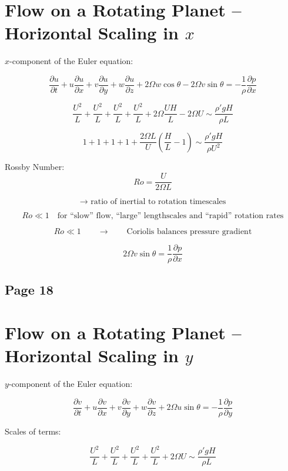 \documentclass[11pt]{article}
\begin{document}
\section*{Flow on a Rotating Planet -- Horizontal Scaling in $x$}

$x$-component of the Euler equation:

\[
    \frac{\partial u}{\partial t}
    +u\frac{\partial u}{\partial x}
    +v\frac{\partial u}{\partial y}
    +w\frac{\partial u}{\partial z}
    +2\Omega w\cos\theta
    -2\Omega v\sin\theta
    =
    -\frac{1}{\rho}\frac{\partial p}{\partial x}
\]

\[
    \frac{U^2}{L}
    +\frac{U^2}{L}
    +\frac{U^2}{L}
    +\frac{U^2}{L}
    +2\Omega\frac{UH}{L}
    -2\Omega U
    \sim
    \frac{\rho' g H}{\rho L}
\]

\[
    1+1+1+1
    +
    \frac{2\Omega L}{U}\left(\frac{H}{L}-1\right)
    \sim
    \frac{\rho' g H}{\rho U^2}
\]

Rossby Number:
\[
    Ro=\frac{U}{2\Omega L}
\]

\[
    \to \text{ ratio of inertial to rotation timescales}
\]

\[
    Ro \ll 1
    \quad
    \text{for ``slow'' flow, ``large'' lengthscales and ``rapid'' rotation rates}
\]

\[
    Ro \ll 1
    \qquad\to\qquad
    \text{Coriolis balances pressure gradient}
\]

\[
    2\Omega v\sin\theta
    =
    \frac{1}{\rho}\frac{\partial p}{\partial x}
\]

\subsection*{Page 18}
\section*{Flow on a Rotating Planet -- Horizontal Scaling in $y$}

$y$-component of the Euler equation:

\[
    \frac{\partial v}{\partial t}
    +u\frac{\partial v}{\partial x}
    +v\frac{\partial v}{\partial y}
    +w\frac{\partial v}{\partial z}
    +2\Omega u\sin\theta
    =
    -\frac{1}{\rho}\frac{\partial p}{\partial y}
\]

Scales of terms:

\[
    \frac{U^2}{L}
    +\frac{U^2}{L}
    +\frac{U^2}{L}
    +\frac{U^2}{L}
    +2\Omega U
    \sim
    \frac{\rho' g H}{\rho L}
\]
\end{document}
